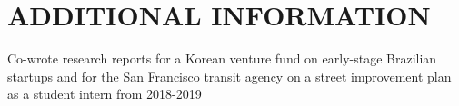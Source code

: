 \section{ADDITIONAL INFORMATION}
\begin{highlights}
\item Co-wrote research reports for a Korean venture fund on early-stage Brazilian startups and for the San Francisco transit agency on a street improvement plan as a student intern from 2018-2019
\end{highlights}
